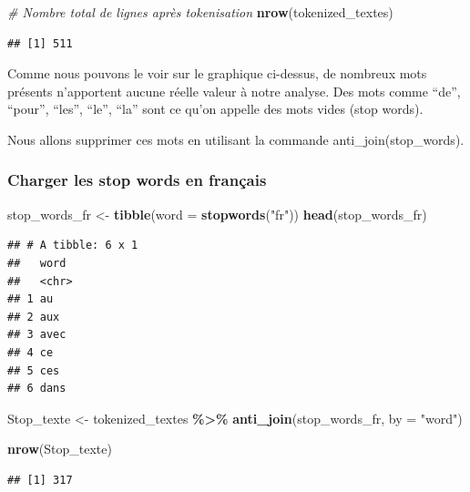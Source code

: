 \documentclass[
]{article}
\newenvironment{Shaded}{\begin{snugshade}}{\end{snugshade}}
\newcommand{\AttributeTok}[1]{\textcolor[rgb]{0.13,0.29,0.53}{#1}}
\newcommand{\CommentTok}[1]{\textcolor[rgb]{0.56,0.35,0.01}{\textit{#1}}}
\newcommand{\FunctionTok}[1]{\textcolor[rgb]{0.13,0.29,0.53}{\textbf{#1}}}
\newcommand{\NormalTok}[1]{#1}
\newcommand{\OtherTok}[1]{\textcolor[rgb]{0.56,0.35,0.01}{#1}}
\newcommand{\SpecialCharTok}[1]{\textcolor[rgb]{0.81,0.36,0.00}{\textbf{#1}}}
\newcommand{\StringTok}[1]{\textcolor[rgb]{0.31,0.60,0.02}{#1}}
\begin{document}
\begin{Shaded}
\begin{Highlighting}[]
\CommentTok{\# Nombre total de lignes après tokenisation}
\FunctionTok{nrow}\NormalTok{(tokenized\_textes)}
\end{Highlighting}
\end{Shaded}

\begin{verbatim}
## [1] 511
\end{verbatim}

Comme nous pouvons le voir sur le graphique ci-dessus, de nombreux mots
présents n'apportent aucune réelle valeur à notre analyse. Des mots
comme ``de'', ``pour'', ``les'', ``le'', ``la'' sont ce qu'on appelle
des mots vides (stop words).

Nous allons supprimer ces mots en utilisant la commande
anti\_join(stop\_words).

\subsubsection{Charger les stop words en
français}\label{charger-les-stop-words-en-franuxe7ais}

\begin{Shaded}
\begin{Highlighting}[]
\NormalTok{stop\_words\_fr }\OtherTok{\textless{}{-}} \FunctionTok{tibble}\NormalTok{(}\AttributeTok{word =} \FunctionTok{stopwords}\NormalTok{(}\StringTok{"fr"}\NormalTok{)) }
\FunctionTok{head}\NormalTok{(stop\_words\_fr)}
\end{Highlighting}
\end{Shaded}

\begin{verbatim}
## # A tibble: 6 x 1
##   word 
##   <chr>
## 1 au   
## 2 aux  
## 3 avec 
## 4 ce   
## 5 ces  
## 6 dans
\end{verbatim}

\begin{Shaded}
\begin{Highlighting}[]
\NormalTok{Stop\_texte }\OtherTok{\textless{}{-}}\NormalTok{ tokenized\_textes }\SpecialCharTok{\%\textgreater{}\%} 
  \FunctionTok{anti\_join}\NormalTok{(stop\_words\_fr, }\AttributeTok{by =} \StringTok{"word"}\NormalTok{)}

\FunctionTok{nrow}\NormalTok{(Stop\_texte)}
\end{Highlighting}
\end{Shaded}

\begin{verbatim}
## [1] 317
\end{verbatim}
\end{document}
